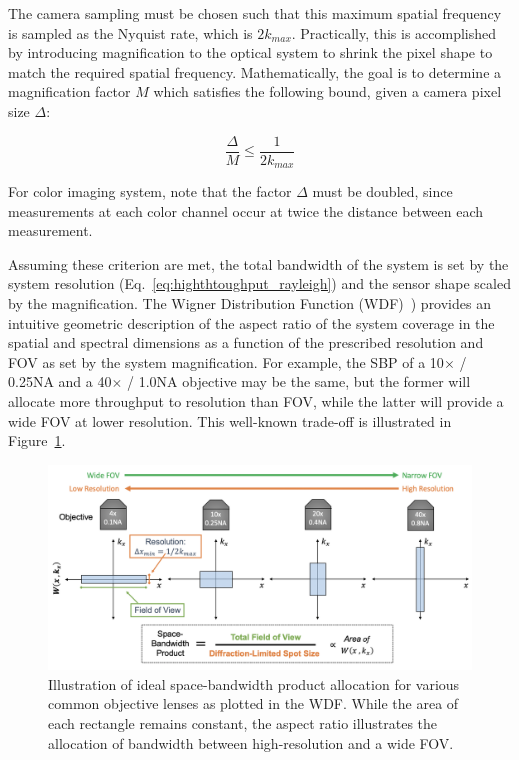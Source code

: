 The camera sampling must be chosen such that this maximum spatial frequency is sampled as the Nyquist rate, which is $2k_{max}$. Practically, this is accomplished by introducing magnification to the optical system to shrink the pixel shape to match the required spatial frequency. Mathematically, the goal is to determine a magnification factor $M$ which satisfies the following bound, given a camera pixel size $\Delta$:

\begin{equation}
    \frac{\Delta}{M} \leq \frac{1}{2k_{max}}
\end{equation}

For color imaging system, note that the factor $\Delta$ must be doubled, since measurements at each color channel occur at twice the distance between each measurement.

Assuming these criterion are met, the total bandwidth of the system is set by the system resolution (Eq.~\ref{eq:highthtoughput_rayleigh}) and the sensor shape scaled by the magnification. The Wigner Distribution Function (WDF)~\cite{BASTIAANS197826}) provides an intuitive geometric description of the aspect ratio of the system coverage in the spatial and spectral dimensions as a function of the prescribed resolution and FOV as set by the system magnification. For example, the SBP of a 10$\times$ / 0.25NA and a 40$\times$ / 1.0NA objective may be the same, but the former will allocate more throughput to resolution than FOV, while the latter will provide a wide FOV at lower resolution. This well-known trade-off is illustrated in Figure~\ref{fig:highthroughput_sbp}.

\begin{figure}
  \centering
    \includegraphics[width=\textwidth]{figures/fig_highthroughput_sbp.png}
  \caption{\label{fig:highthroughput_sbp} Illustration of ideal space-bandwidth product allocation for various common objective lenses as plotted in the WDF. While the area of each rectangle remains constant, the aspect ratio illustrates the allocation of bandwidth between high-resolution and a wide FOV.}
\end{figure}

